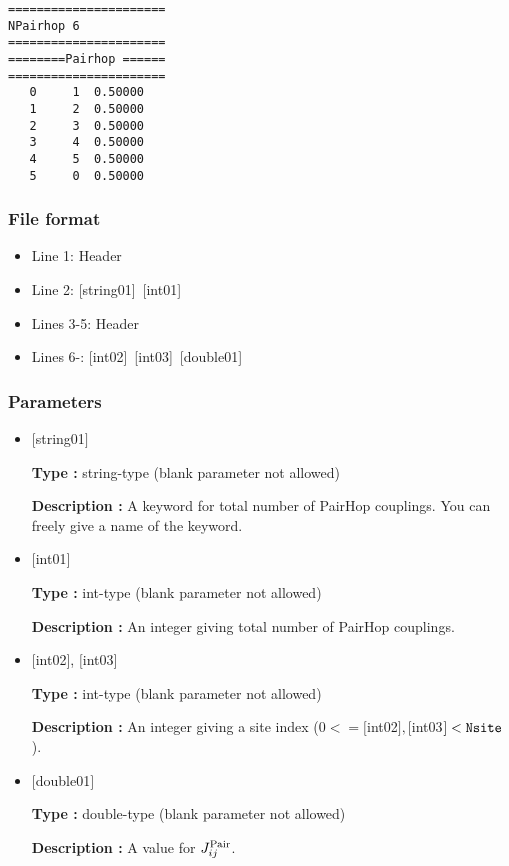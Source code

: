 \begin{minipage}{12.5cm}
\begin{screen}
\begin{verbatim}
====================== 
NPairhop 6  
====================== 
========Pairhop ====== 
====================== 
   0     1  0.50000
   1     2  0.50000
   2     3  0.50000
   3     4  0.50000
   4     5  0.50000
   5     0  0.50000
\end{verbatim}
\end{screen}
\end{minipage}

\subsubsection{File format}
 \begin{itemize}
   \item  Line 1:  Header
   \item  Line 2:   [string01]~[int01]
   \item  Lines 3-5:  Header
   \item  Lines 6-: 
   [int02]~[int03]~[double01] 
  \end{itemize}
\subsubsection{Parameters}
 \begin{itemize}

   \item  $[$string01$]$
   
    {\bf Type :} string-type (blank parameter not allowed)

   {\bf Description :} A keyword for total number of PairHop couplings. You can freely give a name of the keyword.

   \item  $[$int01$]$
   
    {\bf Type :} int-type (blank parameter not allowed)

   {\bf Description :}  An integer giving total number of PairHop couplings.

  \item  $[$int02$]$, $[$int03$]$
  
 {\bf Type :} int-type (blank parameter not allowed)

{\bf Description :} An integer giving a site index ($0<= [$int02$], [$int03$]<\verb|Nsite|$).
 
 \item  $[$double01$]$
   
   {\bf Type :} double-type (blank parameter not allowed)

  {\bf Description :}   A value for $J_{ij}^{\rm Pair}$.
  
\end{itemize}

